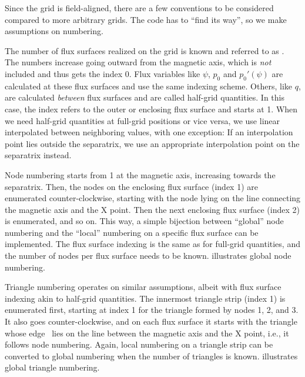 Since the grid is field-aligned, there are a few conventions to be considered compared to more arbitrary grids. The code has to \enquote{find its way}, so we make assumptions on numbering.

The number of flux surfaces realized on the grid is known and referred to as \nflux. The numbers increase going outward from the magnetic axis, which is \emph{not} included and thus gets the index 0. Flux variables like $\psi$, $p_{0}$ and $p_{0}' (\psi)$ are calculated at these flux surfaces and use the same indexing scheme. Others, like $q$, are calculated \emph{between} flux surfaces and are called half-grid quantities. In this case, the index refers to the outer or enclosing flux surface and starts at 1. When we need half-grid quantities at full-grid positions or vice versa, we use linear interpolated between neighboring values, with one exception: If an interpolation point lies outside the separatrix, we use an appropriate interpolation point on the separatrix instead.

Node numbering starts from 1 at the magnetic axis, increasing towards the separatrix. Then, the nodes on the enclosing flux surface (index 1) are enumerated counter-clockwise, starting with the node lying on the line connecting the magnetic axis and the X point. Then the next enclosing flux surface (index 2) is enumerated, and so on. This way, a simple bijection between \enquote{global} node numbering and the \enquote{local} numbering on a specific flux surface can be implemented. The flux surface indexing is the same as for full-grid quantities, and the number of nodes per flux surface needs to be known.  illustrates global node numbering.

Triangle numbering operates on similar assumptions, albeit with flux surface indexing akin to half-grid quantities. The innermost triangle strip (index 1) is enumerated first, starting at index 1 for the triangle formed by nodes 1, 2, and 3. It also goes counter-clockwise, and on each flux surface it starts with the triangle whose edge \inw\ lies on the line between the magnetic axis and the X point, i.e., it follows node numbering. Again, local numbering on a triangle strip can be converted to global numbering when the number of triangles is known.  illustrates global triangle numbering.

